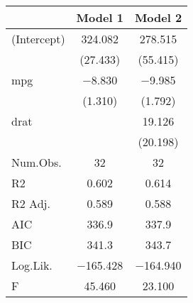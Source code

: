 
\begin{tabular}[t]{lcc}
\toprule
  & Model 1 & Model 2\\
\midrule
(Intercept) & \num{324.082} & \num{278.515}\\
 & (\num{27.433}) & (\num{55.415})\\
mpg & \num{-8.830} & \num{-9.985}\\
 & (\num{1.310}) & (\num{1.792})\\
drat &  & \num{19.126}\\
 &  & (\num{20.198})\\
\midrule
Num.Obs. & \num{32} & \num{32}\\
R2 & \num{0.602} & \num{0.614}\\
R2 Adj. & \num{0.589} & \num{0.588}\\
AIC & \num{336.9} & \num{337.9}\\
BIC & \num{341.3} & \num{343.7}\\
Log.Lik. & \num{-165.428} & \num{-164.940}\\
F & \num{45.460} & \num{23.100}\\
\bottomrule
\end{tabular}
